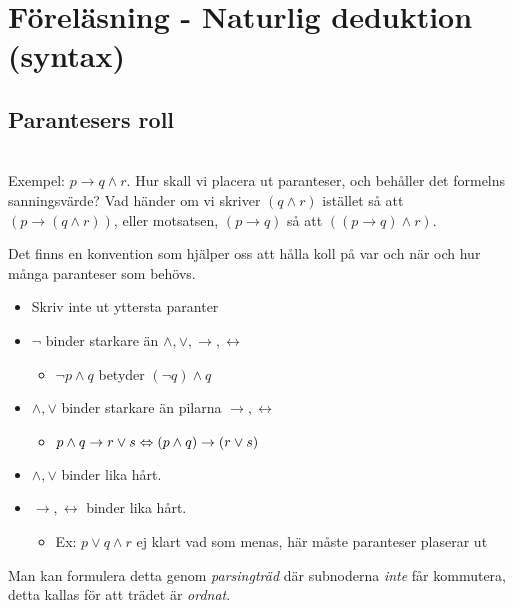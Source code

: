 \section{Föreläsning - Naturlig deduktion (syntax)}

\subsection{Parantesers roll}\hfill\\

\noindent Exempel: $p\rightarrow q\wedge r$. Hur skall vi placera ut paranteser, och behåller det formelns sanningsvärde? Vad händer om vi skriver $(q\wedge r)$ istället så att $(p\rightarrow(q\wedge r))$, eller motsatsen, $(p\rightarrow q)$ så att $((p\rightarrow q)\wedge r)$.
\par\bigskip

\noindent Det finns en konvention som hjälper oss att hålla koll på var och när och hur många paranteser som behövs.

\begin{itemize}
  \item Skriv inte ut yttersta paranter
  \item $\neg$ binder starkare än $\wedge,\vee,\rightarrow,\leftrightarrow$
    \begin{itemize}
      \item $\neg p \wedge q$ betyder $(\neg q)\wedge q$
    \end{itemize}
  \item $\wedge, \vee$ binder starkare än pilarna $\rightarrow, \leftrightarrow$
    \begin{itemize}
      \item $p\wedge q \rightarrow r\vee s \Leftrightarrow (p\wedge q)\rightarrow (r\vee s)$
    \end{itemize}
  \item $\wedge, \vee$ binder lika hårt.
  \item $\rightarrow, \leftrightarrow$ binder lika hårt. 
    \begin{itemize}
      \item Ex: $p\vee q\wedge r$ ej klart vad som menas, här måste paranteser plaserar ut
    \end{itemize}
\end{itemize}
\par\bigskip

\noindent Man kan formulera detta genom \textit{parsingträd} där subnoderna \textit{inte} får kommutera, detta kallas för att trädet är \textit{ordnat}.
\par\bigskip

